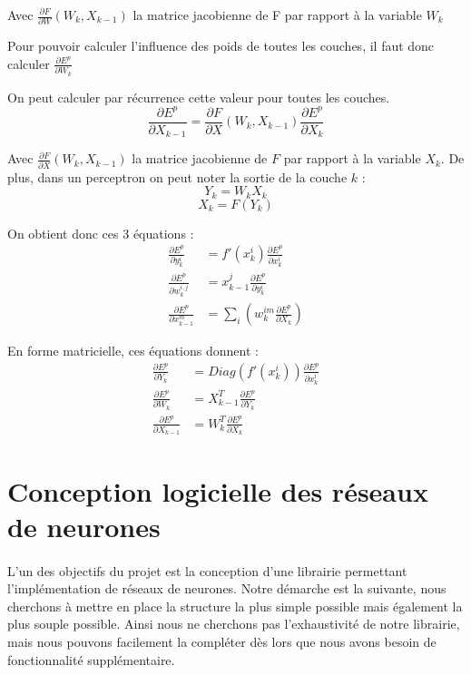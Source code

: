 Avec $\frac{\partial F}{\partial W}(W_k, X_{k-1})$ la matrice jacobienne de F par rapport à la variable $W_k$

Pour pouvoir calculer l'influence des poids de toutes les couches, il faut donc calculer $\frac{\partial E^p}{\partial W_k}$

On peut calculer par récurrence cette valeur pour toutes les couches.
\[
	\frac{\partial E^p}{\partial X _{k-1}} = \frac{\partial F}{\partial X}(W_k, X_{k-1})\frac{\partial E^p}{\partial X_k}
\]

Avec $\frac{\partial F}{\partial X }(W_k, X_{k-1})$ la matrice jacobienne de $F$ par rapport à la variable $X_k$. De plus, dans un perceptron on peut noter la sortie de la couche $k$ : 
\[
Y_k = W_k X_k \]
\[
X_k = F(Y_k)
\]

On obtient donc ces 3 équations : 
\begin{align*}
\frac{\partial E^p}{\partial y_k^i} &= f'(x_k^i)\frac{\partial E^p}{\partial x_k^i} \\
\frac{\partial E^p}{\partial w_k^{i,j}}&= x^j_{k-1} \frac{\partial E^p}{\partial y_k^i}\\
\frac{\partial E^p}{\partial x_{k-1}^m} &= \sum_i(w_k^{im}\frac{\partial E^p}{\partial X_k})
\end{align*}

En forme matricielle, ces équations donnent :
\begin{align*}
\frac{\partial E^p}{\partial Y_k} &= Diag(f'(x_k^i))\frac{\partial E^p}{\partial x_k^i} \\
\frac{\partial E^p}{\partial W_k}&= X^T_{k-1} \frac{\partial E^p}{\partial Y_k}\\
\frac{\partial E^p}{\partial X_{k-1}} &= W_k^T\frac{\partial E^p}{\partial X_k}
\end{align*}


\section{Conception logicielle des réseaux de neurones}
\paragraph*{} %
L'un des objectifs du projet est la conception d'une librairie permettant l'implémentation de réseaux de neurones. Notre démarche est la suivante, nous cherchons à mettre en place la structure la plus simple possible mais également la plus souple possible. Ainsi nous ne cherchons pas l'exhaustivité de notre librairie, mais nous pouvons facilement la compléter dès lors que nous avons besoin de fonctionnalité supplémentaire.


